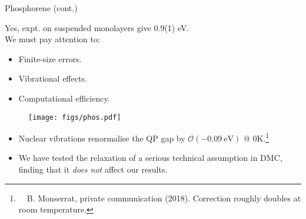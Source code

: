 \documentclass[10pt, pdf, hyperref={draft}, usenames, dvipsnames]{beamer}
\begin{document}
\begin{frame}{Phosphorene (cont.)}

\begin{minipage}[t]{0.45\textwidth}

Yes, expt. on suspended monolayers give 0.9(1) eV.\footnotemark\\

We must pay attention to:
\vspace{0.3cm}
\begin{itemize}
  \item Finite-size errors.
  \item Vibrational effects.
  \item Computational efficiency.
\end{itemize}

\end{minipage}%
\hfill
\begin{minipage}[t]{0.5\textwidth}

\begin{figure}[H]
  \centering
  \texttt{[image: figs/phos.pdf]}
\end{figure}

\end{minipage}%


\begin{itemize}
  \item Nuclear vibrations renormalise the QP gap by
  $\mathcal{O}(-0.09\ \text{eV})$ @ 0K.\footnote{~~B.
  Monserrat, private communication (2018). Correction roughly doubles at room temperature.}

  \item We have tested the relaxation of a serious technical assumption in DMC,
  finding that it \textit{does not} affect our results.

\end{itemize}

\end{frame}
\end{document}
